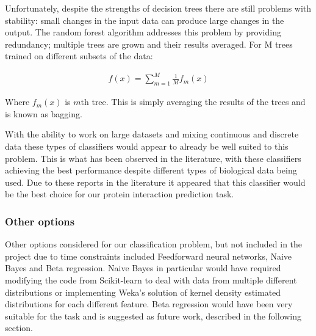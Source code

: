 Unfortunately, despite the strengths of decision trees there are still problems with stability: small changes in the input data can produce large changes in the output\autocite[550]{murphy_machine_2012}.
The random forest algorithm addresses this problem by providing redundancy; multiple trees are grown and their results averaged.
For M trees trained on different subsets of the data\autocite[551]{murphy_machine_2012}:

\begin{align}
    f(x) = \sum_{m=1}^{M} \frac{1}{M} f_{m}(x)
\end{align}

Where $f_{m}(x)$ is $m$th tree. This is simply averaging the results of the trees and is known as bagging.

With the ability to work on large datasets and mixing continuous and discrete data these types of classifiers would appear to already be well suited to this problem.
This is what has been observed in the literature, with these classifiers achieving the best performance despite different types of biological data being used\autocites{qi_evaluation_2006,rodgers-melnick_predicting_2013}.
Due to these reports in the literature it appeared that this classifier would be the best choice for our protein interaction prediction task.


\subsubsection*{Other options}

Other options considered for our classification problem, but not included in the project due to time constraints included Feedforward neural networks, Naive Bayes and Beta regression.
Naive Bayes in particular would have required modifying the code from Scikit-learn to deal with data from multiple different distributions or implementing Weka's solution of kernel density estimated distributions for each different feature\autocite{john_estimating_1995}.
Beta regression would have been very suitable for the task and is suggested as future work, described in the following section.

